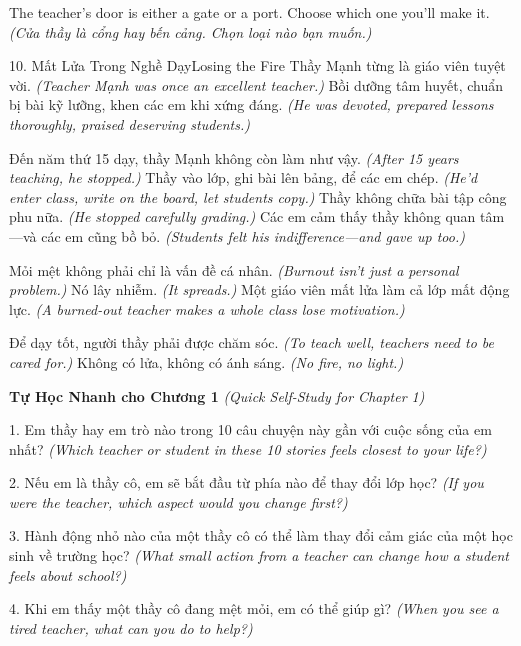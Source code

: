 \begin{ghinhoanh}
The teacher's door is either a gate or a port. Choose which one you'll make it.
\textit{(Cửa thầy là cổng hay bến cảng. Chọn loại nào bạn muốn.)}
\end{ghinhoanh}

\begin{truyen}{10. Mất Lửa Trong Nghề Dạy}{Losing the Fire}
Thầy Mạnh từng là giáo viên tuyệt vời.
\textit{(Teacher Mạnh was once an excellent teacher.)}
Bồi dưỡng tâm huyết, chuẩn bị bài kỹ lưỡng, khen các em khi xứng đáng.
\textit{(He was devoted, prepared lessons thoroughly, praised deserving students.)}

Đến năm thứ 15 dạy, thầy Mạnh không còn làm như vậy.
\textit{(After 15 years teaching, he stopped.)}
Thầy vào lớp, ghi bài lên bảng, để các em chép.
\textit{(He'd enter class, write on the board, let students copy.)}
Thầy không chữa bài tập công phu nữa.
\textit{(He stopped carefully grading.)}
Các em cảm thấy thầy không quan tâm—và các em cũng bồ bỏ.
\textit{(Students felt his indifference—and gave up too.)}

Mỏi mệt không phải chỉ là vấn đề cá nhân.
\textit{(Burnout isn't just a personal problem.)}
Nó lây nhiễm.
\textit{(It spreads.)}
Một giáo viên mất lửa làm cả lớp mất động lực.
\textit{(A burned-out teacher makes a whole class lose motivation.)}
\end{truyen}

\begin{baihoc}
Để dạy tốt, người thầy phải được chăm sóc.
\textit{(To teach well, teachers need to be cared for.)}
Không có lửa, không có ánh sáng.
\textit{(No fire, no light.)}
\end{baihoc}

\begin{tuhocnhanh}
\textbf{Tự Học Nhanh cho Chương 1}
\textit{(Quick Self-Study for Chapter 1)}

1. Em thầy hay em trò nào trong 10 câu chuyện này gần với cuộc sống của em nhất?
\textit{(Which teacher or student in these 10 stories feels closest to your life?)}

2. Nếu em là thầy cô, em sẽ bắt đầu từ phía nào để thay đổi lớp học?
\textit{(If you were the teacher, which aspect would you change first?)}

3. Hành động nhỏ nào của một thầy cô có thể làm thay đổi cảm giác của một học sinh về trường học?
\textit{(What small action from a teacher can change how a student feels about school?)}

4. Khi em thấy một thầy cô đang mệt mỏi, em có thể giúp gì?
\textit{(When you see a tired teacher, what can you do to help?)}
\end{tuhocnhanh}

\ngancach
